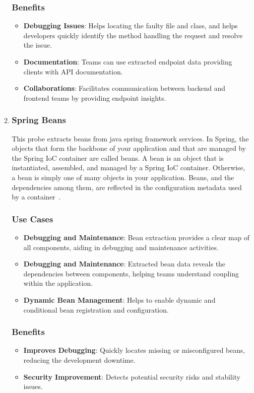 \begin{enumerate}[leftmargin=*, label=\arabic*.]
	\subsubsection{Benefits}
	\begin{itemize}[label=$\bullet$]
		\item \textbf{Debugging Issues}: Helps locating the faulty file and class, and helps developers quickly identify the method handling the request and resolve the issue.
		\item \textbf{Documentation}: Teams can use extracted endpoint data providing clients with API documentation.
		\item \textbf{Collaborations}: Facilitates communication between backend and frontend teams by providing endpoint insights.
	\end{itemize} 

    \item \subsubsection*{Spring Beans}
   	This probe extracts beans from java spring framework services. In Spring, the objects that form the backbone of your application and that are managed by the Spring IoC container are called beans. A bean is an object that is instantiated, assembled, and managed by a Spring IoC container. Otherwise, a bean is simply one of many objects in your application. Beans, and the dependencies among them, are reflected in the configuration metadata used by a container~\citep{spring_beans_intro}.
	\subsubsection{Use Cases}
	\begin{itemize}[label=$\bullet$]
		\item \textbf{Debugging and Maintenance}: Bean extraction provides a clear map of all components, aiding in debugging and maintenance activities.
		\item \textbf{Debugging and Maintenance}: Extracted bean data reveals the dependencies between components, helping teams understand coupling within the application.
		\item \textbf{Dynamic Bean Management}: Helps to enable dynamic and conditional bean registration and configuration.
	\end{itemize}
	\subsubsection{Benefits}
	\begin{itemize}[label=$\bullet$]
		\item \textbf{Improves Debugging}: Quickly locates missing or misconfigured beans, reducing the development downtime.
		\item \textbf{Security Improvement}: Detects potential security risks and stability issues.
	\end{itemize} 


\end{enumerate}
